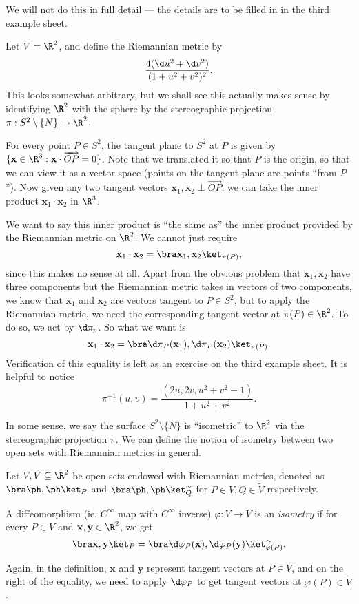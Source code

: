 \documentclass[a4paper]{article}
\begin{document}
\begin{eg}
  We will not do this in full detail --- the details are to be filled in in the third example sheet.

  Let $V = \R^2$, and define the Riemannian metric by
  \[
    \frac{4(\d u^2 + \d v^2)}{(1 + u^2 + v^2)^2}.
  \]
  This looks somewhat arbitrary, but we shall see this actually makes sense by identifying $\R^2$ with the sphere by the stereographic projection $\pi: S^2 \setminus \{N\} \to \R^2$.

  For every point $P \in S^2$, the tangent plane to $S^2$ at $P$ is given by $\{\mathbf{x} \in \R^3: \mathbf{x}\cdot \overrightarrow{OP} = 0\}$. Note that we translated it so that $P$ is the origin, so that we can view it as a vector space (points on the tangent plane are points ``from $P$''). Now given any two tangent vectors $\mathbf{x}_1, \mathbf{x}_2 \perp \overrightarrow{OP}$, we can take the inner product $\mathbf{x}_1 \cdot \mathbf{x}_2$ in $\R^3$.

  We want to say this inner product is ``the same as'' the inner product provided by the Riemannian metric on $\R^2$. We cannot just require
  \[
    \mathbf{x}_1 \cdot \mathbf{x}_2 = \bra \mathbf{x}_1, \mathbf{x}_2 \ket_{\pi(P)},
  \]
  since this makes no sense at all. Apart from the obvious problem that $\mathbf{x}_1, \mathbf{x}_2$ have three components but the Riemannian metric takes in vectors of two components, we know that $\mathbf{x}_1$ and $\mathbf{x}_2$ are vectors tangent to $P \in S^2$, but to apply the Riemannian metric, we need the corresponding tangent vector at $\pi(P) \in \R^2$. To do so, we act by $\d \pi_p$. So what we want is
  \[
    \mathbf{x}_1 \cdot \mathbf{x}_2 = \bra \d \pi_P(\mathbf{x}_1), \d \pi_P(\mathbf{x}_2)\ket_{\pi(P)}.
  \]
  Verification of this equality is left as an exercise on the third example sheet. It is helpful to notice
  \[
    \pi^{-1}(u, v) = \frac{(2u, 2v, u^2 + v^2 - 1)}{1 + u^2 + v^2}.
  \]
\end{eg}

In some sense, we say the surface $S^2 \setminus \{N\}$ is ``isometric'' to $\R^2$ via the stereographic projection $\pi$. We can define the notion of isometry between two open sets with Riemannian metrics in general.

\begin{defi}[Isometry]
  Let $V, \tilde{V} \subseteq \R^2$ be open sets endowed with Riemannian metrics, denoted as $\bra \ph, \ph\ket_P$ and $\bra \ph, \ph\ket^\sim_Q$ for $P \in V, Q \in \tilde{V}$ respectively.

  A diffeomorphism (ie. $C^\infty$ map with $C^\infty$ inverse) $\varphi: V \to \tilde{V}$ is an \emph{isometry} if for every $P \in V$ and $\mathbf{x}, \mathbf{y} \in \R^2$, we get
  \[
    \bra \mathbf{x}, \mathbf{y}\ket_P = \bra \d \varphi_P(\mathbf{x}), \d\varphi_P(\mathbf{y})\ket^\sim_{\varphi(P)}.
  \]
\end{defi}
Again, in the definition, $\mathbf{x}$ and $\mathbf{y}$ represent tangent vectors at $P \in V$, and on the right of the equality, we need to apply $\d \varphi_P$ to get tangent vectors at $\varphi(P) \in \tilde{V}$.
\end{document}
